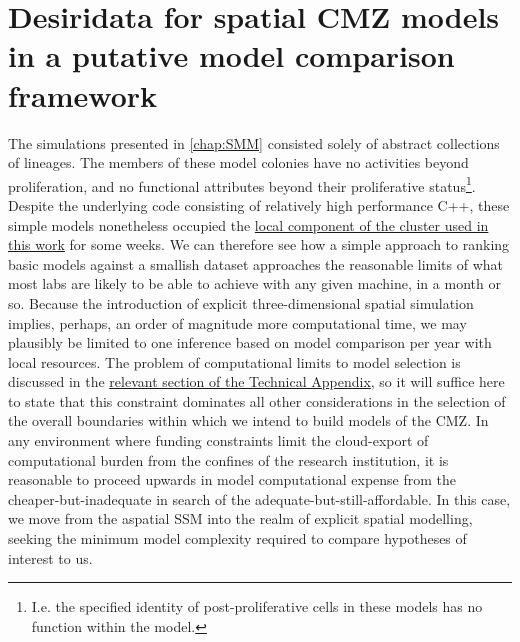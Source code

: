 \section{Desiridata for spatial CMZ models in a putative model comparison framework}
The simulations presented in \autoref{chap:SMM} consisted solely of abstract collections of lineages. The members of these model colonies have no activities beyond proliferation, and no functional attributes beyond their proliferative status\footnote{I.e. the specified identity of post-proliferative cells in these models has no function within the model.}. Despite the underlying code consisting of relatively high performance C++, these simple models nonetheless occupied the \hyperref[cluster]{local component of the cluster used in this work} for some weeks. We can therefore see how a simple approach to ranking basic models against a smallish dataset approaches the reasonable limits of what most labs are likely to be able to achieve with any given machine, in a month or so. Because the introduction of explicit three-dimensional spatial simulation implies, perhaps, an order of magnitude more computational time, we may plausibly be limited to one inference based on model comparison per year with local resources. The problem of computational limits to model selection is discussed in the \hyperref[complimits]{relevant section of the Technical Appendix}, so it will suffice here to state that this constraint dominates all other considerations in the selection of the overall boundaries within which we intend to build models of the CMZ. In any environment where funding constraints limit the cloud-export of computational burden from the confines of the research institution, it is reasonable to proceed upwards in model computational expense from the cheaper-but-inadequate in search of the adequate-but-still-affordable. In this case, we move from the aspatial SSM into the realm of explicit spatial modelling, seeking the minimum model complexity required to compare hypotheses of interest to us.

